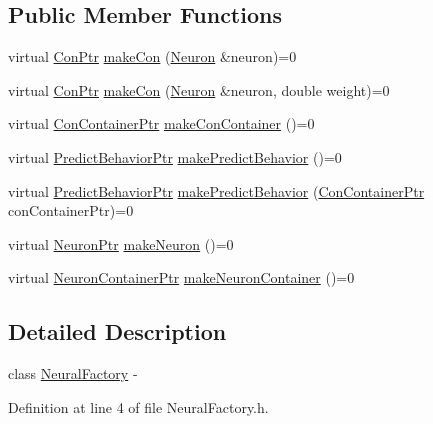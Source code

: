 \subsection*{Public Member Functions}
\begin{DoxyCompactItemize}
\item 
virtual \hyperlink{_a_m_o_r_e_8h_a169bb8e5f26ce70bf2b10dec2fb5ee50}{ConPtr} \hyperlink{class_neural_factory_a2e156aff271f0c6c134a8bad7d164f73}{makeCon} (\hyperlink{class_neuron}{Neuron} \&neuron)=0
\item 
virtual \hyperlink{_a_m_o_r_e_8h_a169bb8e5f26ce70bf2b10dec2fb5ee50}{ConPtr} \hyperlink{class_neural_factory_a0d11171bb9e5d09544e8d58a9324b923}{makeCon} (\hyperlink{class_neuron}{Neuron} \&neuron, double weight)=0
\item 
virtual \hyperlink{_a_m_o_r_e_8h_a1021dbaf961d1c8da6d58a8566e5778b}{ConContainerPtr} \hyperlink{class_neural_factory_a4fa5f4f57a2551c95481146b1a0c83d7}{makeConContainer} ()=0
\item 
virtual \hyperlink{_a_m_o_r_e_8h_a1fb2f1f8fdf1e08c42ef4bdce436af93}{PredictBehaviorPtr} \hyperlink{class_neural_factory_a1afe8d8d674aad726337295f46b75810}{makePredictBehavior} ()=0
\item 
virtual \hyperlink{_a_m_o_r_e_8h_a1fb2f1f8fdf1e08c42ef4bdce436af93}{PredictBehaviorPtr} \hyperlink{class_neural_factory_aae1e62cacbda2061e746abf31e01ad29}{makePredictBehavior} (\hyperlink{_a_m_o_r_e_8h_a1021dbaf961d1c8da6d58a8566e5778b}{ConContainerPtr} conContainerPtr)=0
\item 
virtual \hyperlink{_a_m_o_r_e_8h_ac1ea936c2c7728eb382278131652fef4}{NeuronPtr} \hyperlink{class_neural_factory_a7921519c79b2fb0a5868661fe934f694}{makeNeuron} ()=0
\item 
virtual \hyperlink{_a_m_o_r_e_8h_a6157c259718f98f808c85d7f77048970}{NeuronContainerPtr} \hyperlink{class_neural_factory_ab8fe3634f3715f99616fe9498a29badb}{makeNeuronContainer} ()=0
\end{DoxyCompactItemize}


\subsection{Detailed Description}
class \hyperlink{class_neural_factory}{NeuralFactory} -\/ 

Definition at line 4 of file NeuralFactory.h.



